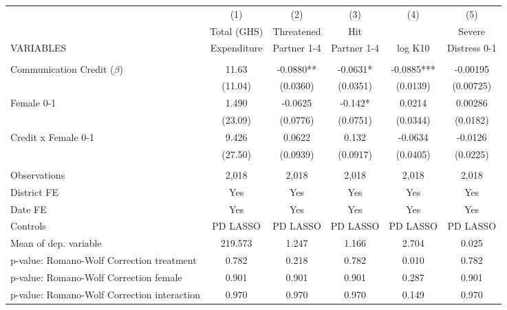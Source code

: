 \begin{tabular}{lccccc} \hline
 & (1) & (2) & (3) & (4) & (5) \\
 & Total (GHS) & Threatened & Hit &  & Severe \\
VARIABLES & Expenditure & Partner 1-4 & Partner 1-4 & log K10 & Distress 0-1 \\ \hline
 &  &  &  &  &  \\
Communication Credit ($\beta$) & 11.63 & -0.0880** & -0.0631* & -0.0885*** & -0.00195 \\
 & (11.04) & (0.0360) & (0.0351) & (0.0139) & (0.00725) \\
Female 0-1 & 1.490 & -0.0625 & -0.142* & 0.0214 & 0.00286 \\
 & (23.09) & (0.0776) & (0.0751) & (0.0344) & (0.0182) \\
Credit x Female 0-1 & 9.426 & 0.0622 & 0.132 & -0.0634 & -0.0126 \\
 & (27.50) & (0.0939) & (0.0917) & (0.0405) & (0.0225) \\
 &  &  &  &  &  \\
Observations & 2,018 & 2,018 & 2,018 & 2,018 & 2,018 \\
District FE & Yes & Yes & Yes & Yes & Yes \\
Date FE & Yes & Yes & Yes & Yes & Yes \\
Controls & PD LASSO & PD LASSO & PD LASSO & PD LASSO & PD LASSO \\
Mean of dep. variable & 219.573 & 1.247 & 1.166 & 2.704 & 0.025 \\
p-value: Romano-Wolf Correction treatment & 0.782 & 0.218 & 0.782 & 0.010 & 0.782 \\
p-value: Romano-Wolf Correction female & 0.901 & 0.901 & 0.901 & 0.287 & 0.901 \\
 p-value: Romano-Wolf Correction interaction & 0.970 & 0.970 & 0.970 & 0.149 & 0.970 \\ \hline
\end{tabular}
